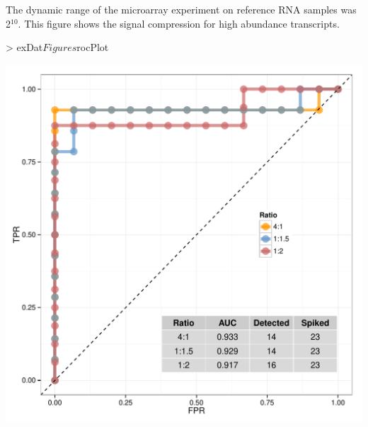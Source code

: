 \documentclass{article}
\begin{document}
The dynamic range of the microarray experiment on reference RNA samples was 2$^{10}$.
This figure shows the signal compression for high abundance transcripts.
\clearpage
\begin{center}
\begin{Schunk}
\begin{Sinput}
> exDat$Figures$rocPlot
\end{Sinput}
\end{Schunk}
\includegraphics{erccdashboardVignette-seqcArrayPlotB}
\end{center}
\end{document}
